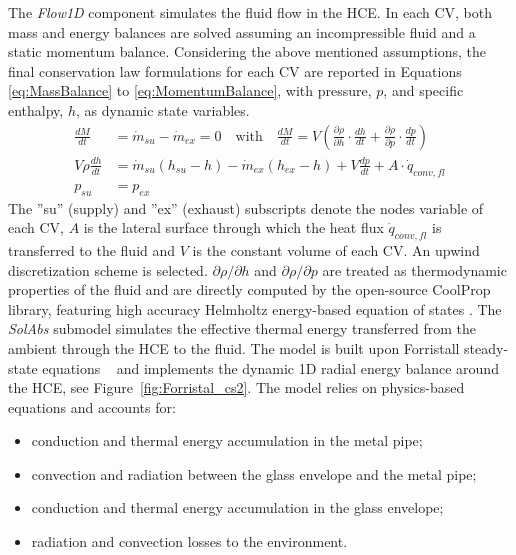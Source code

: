 \documentclass[final,3p,times,review]{elsarticle}
\begin{document}
The \textit{Flow1D} component simulates the fluid flow in the HCE. In each CV, both mass and energy balances are solved assuming an incompressible fluid and a static momentum balance. Considering the above mentioned assumptions, the final conservation law formulations for each CV are reported in Equations \ref{eq:MassBalance} to \ref{eq:MomentumBalance}, with pressure, $p$, and specific enthalpy, $h$, as dynamic state variables.
%
\begin{align}
\label{eq:MassBalance}
\frac{dM}{dt} & = \dot{m}_{su}-\dot{m}_{ex} = 0  \quad \text{with} \quad
\frac{dM}{dt} = V \left( \frac{\partial \rho}{\partial h}  \cdot \frac{dh}{dt} + \frac{\partial \rho}{\partial p} \cdot \frac{dp}{dt} \right) \\
\label{eq:EnergyBalance}
V\rho \frac{dh}{dt} & = \dot{m}_{su}(h_{su} - h) - \dot{m}_{ex}(h_{ex} - h) + V \frac{dp}{dt} + A \cdot \dot{q}_{conv,fl} \\
\label{eq:MomentumBalance}
p_{su} & = p_{ex}
\end{align}
%
The ''su'' (supply) and ''ex'' (exhaust) subscripts denote the nodes variable of each CV, $A$ is the lateral surface through which the heat flux $\dot{q}_{conv,fl}$ is transferred to the fluid and $V$ is the constant volume of each CV. An upwind discretization scheme is selected.
$\partial \rho / \partial h$ and $\partial \rho / \partial p$ are treated as  thermodynamic properties of the fluid and are directly computed by the open-source CoolProp library, featuring high accuracy Helmholtz energy-based equation of states \cite{Bell_CoolProp_2013}.
The \textit{SolAbs} submodel simulates the effective thermal energy transferred from the ambient through the HCE to the fluid. The model is built upon Forristall steady-state equations ~\cite{Forristall2003} and implements the dynamic 1D radial energy balance around the HCE, see Figure~\ref{fig:Forristal_cs2}. The model relies on physics-based equations and accounts for:
%
\begin{itemize}
	\item conduction and thermal energy accumulation in the metal pipe;
	\item convection and radiation between the glass envelope and the metal pipe;
	\item conduction and thermal energy accumulation in the glass envelope;
	\item radiation and convection losses to the environment.
\end{itemize}
%
\end{document}
